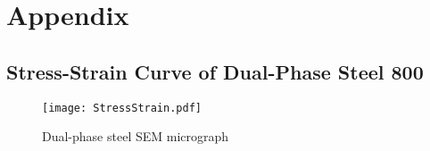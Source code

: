 
\chapter{Appendix} %

\label{Appendix} %

\section{Stress-Strain Curve of Dual-Phase Steel 800}

\begin{figure}[H]
\centering
  \texttt{[image: StressStrain.pdf]}
  \caption{Dual-phase steel SEM micrograph}
  \label{fig:DPStressStrain}
\end{figure}

